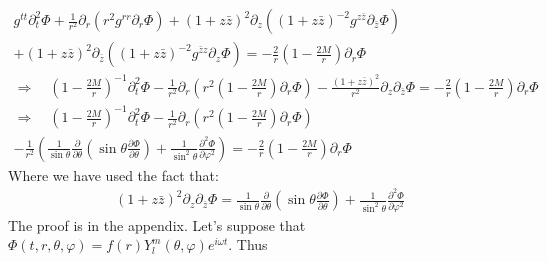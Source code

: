\documentclass[12pt]{article}
\def\nn{\nonumber}
\begin{document}
\begin{gather}
g^{tt}
\partial_{t}^{2}\Phi
+
\frac{1}{r^{2}}
\partial_{r}
(r^{2} g^{rr} \partial_{r}\Phi)
+
(1 + z \bar{z})^{2}
\partial_{z}
((1 + z \bar{z})^{-2} g^{z \bar{z}} \partial_{\bar{z}} \Phi)
\nn \\
+
(1 + z \bar{z})^{2}
\partial_{\bar{z}}
((1 + z \bar{z})^{-2} g^{\bar{z} z} \partial_{z} \Phi)
=
-\frac{2}{r}
(1 - \frac{2 M}{r})
\partial_{r}
\Phi
\nn \\
\Rightarrow
\quad
(1 - \frac{2 M}{r})^{-1}
\partial_{t}^{2}\Phi
-
\frac{1}{r^{2}}
\partial_{r}
\left(
r^{2} (1 - \frac{2 M}{r}) \partial_{r}\Phi
\right)
-
\frac{(1 + z \bar{z})^{2}}{r^{2}}
\partial_{z}\partial_{\bar{z}} \Phi
=
-\frac{2}{r}
(1 - \frac{2 M}{r})
\partial_{r}
\Phi
\nn \\
\Rightarrow
\quad
(1 - \frac{2 M}{r})^{-1}
\partial_{t}^{2}\Phi
-
\frac{1}{r^{2}}
\partial_{r}
\left(
r^{2} (1 - \frac{2 M}{r}) \partial_{r}\Phi
\right)
\nn \\
-
\frac{1}{r^{2}}
\left(
\frac{1}{\sin\theta}
\frac{\partial}{\partial \theta}
\left(
\sin\theta
\frac{\partial \Phi}{\partial \theta}
\right)
+
\frac{1}{\sin^{2}\theta}
\frac{\partial^{2}\Phi}{\partial \varphi^{2}}
\right)
=
-\frac{2}{r}
(1 - \frac{2 M}{r})
\partial_{r}
\Phi
\end{gather}
Where we have used the fact that:
\begin{gather}
(1 + z \bar{z})^{2}
\partial_{z}\partial_{\bar{z}} \Phi
=
\frac{1}{\sin\theta}
\frac{\partial}{\partial \theta}
\left(
\sin\theta
\frac{\partial \Phi}{\partial \theta}
\right)
+
\frac{1}{\sin^{2}\theta}
\frac{\partial^{2}\Phi}{\partial \varphi^{2}}
\end{gather}
The proof is in the appendix. Let's suppose that $\Phi(t,r,\theta,\varphi) = f(r) Y_{l}^{m}(\theta,\varphi) e^{i \omega t}$. Thus
\end{document}

